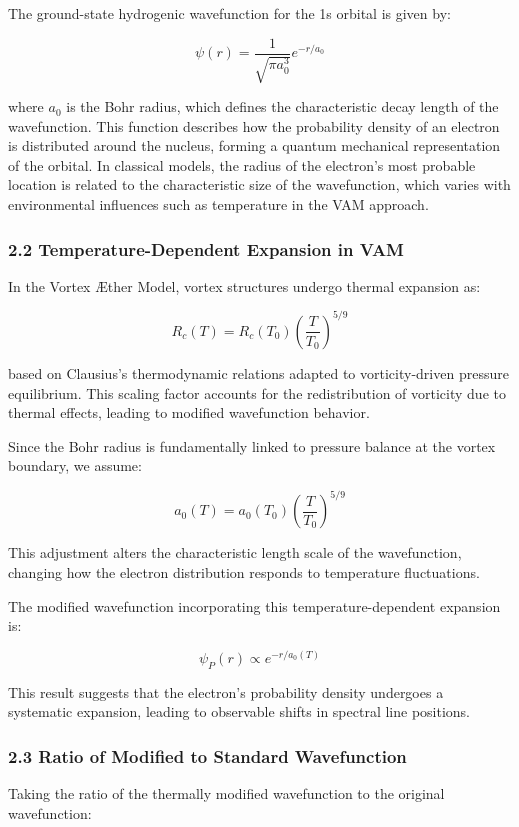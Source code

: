 The ground-state hydrogenic wavefunction for the 1s orbital is given by:

\[ \psi(r) = \frac{1}{\sqrt{\pi a_0^3}} e^{-r/a_0} \]

where \( a_0 \) is the Bohr radius, which defines the characteristic decay length of the wavefunction. This function describes how the probability density of an electron is distributed around the nucleus, forming a quantum mechanical representation of the orbital. In classical models, the radius of the electron's most probable location is related to the characteristic size of the wavefunction, which varies with environmental influences such as temperature in the VAM approach.

\subsubsection*{2.2 Temperature-Dependent Expansion in VAM}

In the Vortex Æther Model, vortex structures undergo thermal expansion as:

\[ R_c(T) = R_c (T_0) \left( \frac{T}{T_0} \right)^{5/9} \]

based on Clausius's thermodynamic relations adapted to vorticity-driven pressure equilibrium. This scaling factor accounts for the redistribution of vorticity due to thermal effects, leading to modified wavefunction behavior.

Since the Bohr radius is fundamentally linked to pressure balance at the vortex boundary, we assume:

\[ a_0(T) = a_0 (T_0) \left( \frac{T}{T_0} \right)^{5/9} \]

This adjustment alters the characteristic length scale of the wavefunction, changing how the electron distribution responds to temperature fluctuations.

The modified wavefunction incorporating this temperature-dependent expansion is:

\[ \psi_P(r) \propto e^{-r/a_0(T)} \]

This result suggests that the electron's probability density undergoes a systematic expansion, leading to observable shifts in spectral line positions.


\subsubsection*{2.3 Ratio of Modified to Standard Wavefunction}

Taking the ratio of the thermally modified wavefunction to the original wavefunction:

